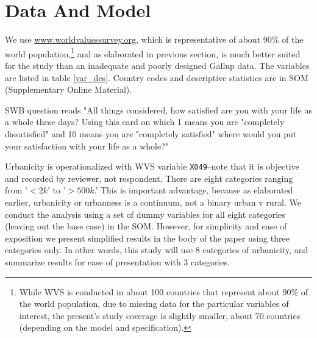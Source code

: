 \documentclass[10pt, letterpaper]{article}
\begin{document}
\section{Data And Model}

We use \url{www.worldvaluessurvey.org}, which is representative of about 90\% of
the world population,\footnote{While WVS is conducted in about 100 countries
  that represent about 90\% of the world population, due to missing data for
  the particular variables of interest, the present's study coverage is slightly
smaller, about 70 countries (depending on the model and specification).} and  as elaborated in previous section, is much  better
suited for the study than an inadequate and poorly designed  %
Gallup data. The variables are listed in table \ref{var_des}. 
Country codes and descriptive statistics are in SOM (Supplementary Online Material).  %

SWB question reads "All things considered, how  satisfied are you with your life as a whole these days? Using this card on which 1 means you are "completely dissatisfied" and 10 means you are "completely satisfied" where would you put your satisfaction with your life as a whole?"

Urbanicity is operationalized with WVS variable \texttt{X049}--note that it is objective and
recorded by reviewer, not respondent. There are eight categories ranging from
'$<2k$' to '$>500k$.' This is important advantage, because as elaborated earlier,
urbanicity or urbanness is a continuum, not a binary urban v rural. We conduct
the analysis using a set of dummy variables for all eight categories (leaving out
the base case) in the SOM. However, for simplicity and ease of exposition we
present simplified results in the body of the paper using three categories only.
In other words, this study will use 8 categories of urbanicity,
and summarize results for ease of presentation with 3 categories.
\end{document}

